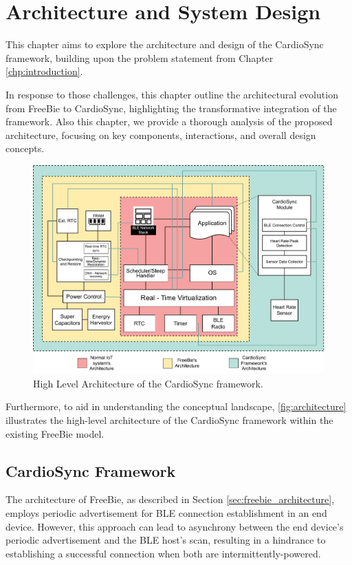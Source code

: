 \chapter{Architecture and System Design}
\label{chap:architecture}

This chapter aims to explore the architecture and design of the CardioSync framework, building upon the problem statement from Chapter \ref{chp:introduction}.
\vspace{1\baselineskip}

\noindent In response to those challenges, this chapter outline the architectural evolution from FreeBie to CardioSync, highlighting the transformative integration of the framework. Also this chapter, we provide a thorough analysis of the proposed architecture, focusing on key components, interactions, and overall design concepts.
\vspace{1\baselineskip}

\begin{figure}[t]
    \centering
    \includegraphics[width=\linewidth]{chapters/Architecture/architecture.pdf}
    \caption{High Level Architecture of the CardioSync framework.}
    \label{fig:architecture}
\end{figure}

\noindent Furthermore, to aid in understanding the conceptual landscape, \autoref{fig:architecture} illustrates the high-level architecture of the CardioSync framework within the existing FreeBie model.

\section{CardioSync Framework}
The architecture of FreeBie, as described in Section \ref{sec:freebie_architecture}, employs periodic advertisement for BLE connection establishment in an end device. However, this approach can lead to asynchrony between the end device's periodic advertisement and the BLE host's scan, resulting in a hindrance to establishing a successful connection when both are intermittently-powered.
\vspace{1\baselineskip}

